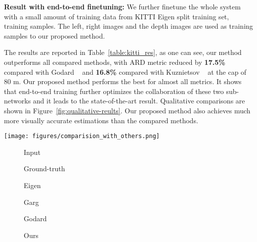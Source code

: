 \documentclass[10pt,twocolumn,letterpaper]{article}
\begin{document}
\textbf{Result with end-to-end finetuning:}
We further finetune the whole system with a small amount of training data from KITTI Eigen split training set,  training samples. The left, right images and the depth images are used as training samples to our proposed method.

The results are reported in Table~\ref{table:kitti_res}, as one can see, our method outperforms all compared methods, with ARD metric reduced by \textbf{17.5\%} compared with Godard \etal~\cite{godard2016unsupervised} and \textbf{16.8\%} compared with Kuznietsov \etal~\cite{kuznietsov2017semi} at the cap of 80 m. Our proposed method performs the best for almost all metrics. It shows that end-to-end training further optimizes the collaboration of these two sub-networks and it leads to the state-of-the-art result. Qualitative comparisons are shown in Figure~\ref{fig:qualitative-reults}. Our proposed method also achieves much more visually accurate estimations than the compared methods.

\begin{figure*}[t!]
\centering
	\texttt{[image: figures/comparision\_with\_others.png]}
	\begin{subfigure}[b]{0.16\linewidth}
    \caption{Input}
  	\end{subfigure}
  	\begin{subfigure}[b]{0.16\linewidth}
    \caption{Ground-truth}
  	\end{subfigure}
	\begin{subfigure}[b]{0.16\linewidth}
    \caption{Eigen \etal~\cite{eigen2014depth}}
  	\end{subfigure}
  	\begin{subfigure}[b]{0.16\linewidth}
    \caption{Garg \etal~\cite{garg2016unsupervised}}
  	\end{subfigure}
  	\begin{subfigure}[b]{0.16\linewidth}
    \caption{Godard \etal~\cite{godard2016unsupervised}}
  	\end{subfigure}
  	\begin{subfigure}[b]{0.16\linewidth}
    \caption{Ours}
  	\end{subfigure}
  	\vspace{-12pt}
	\caption{Qualitative results on the KITTI Eigen test set. Sparse ground-truth labels have been interpolated for visualization.
Note that the prediction of our method can better separate the background and foreground or different entities close to each other. Also, our results are crisper and neater. In addition, we are doing better on the objects such as trees, poles, traffic sign and pedestrians, whose depth are generally hard to be inferred accurately.}
	\label{fig:qualitative-reults}
	\vspace{-10pt}
\end{figure*}
\end{document}
